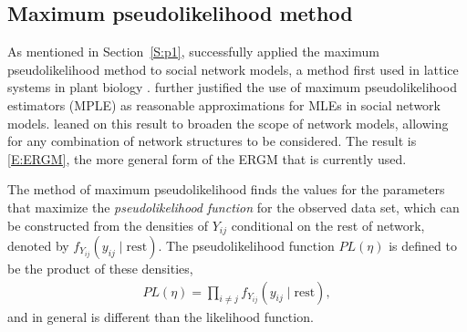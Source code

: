 %



\subsection{Maximum pseudolikelihood method} \label{S:pseudolikelihood}
As mentioned in Section~\ref{S:p1}, \citet{Frank:1986} successfully applied 
the maximum pseudolikelihood method to social network models, a method first used in lattice systems in plant biology \citep{Besag:1974,Besag:1975}.  \citet{Strauss:1990} further justified the use of 
maximum pseudolikelihood estimators (MPLE) as reasonable approximations for MLEs in 
social network models.  \citet*{Wasserman:1996, Pattison:1999, logit} leaned on this 
result to broaden the scope of network models, allowing 
for any combination of network structures to be considered.  The result is \eqref{E:ERGM},
the more general form of the ERGM that is currently used.

The method of maximum pseudolikelihood finds the values for the parameters that 
maximize the \textit{pseudolikelihood function} for the observed 
data set, which can be constructed from the densities of $Y_{ij}$ 
conditional on the rest of network, denoted by $f_{Y_{ij}}( y_{ij} \mid \textrm{rest})$.
The pseudolikelihood function $PL(\eta)$ is defined to be the product of these densities,
\begin{align}
	PL(\eta) = \prod_{i \neq j}f_{Y_{ij}}( y_{ij} \mid \textrm{rest}), \label{E:PL}
\end{align}
and in general is different than the likelihood function.

